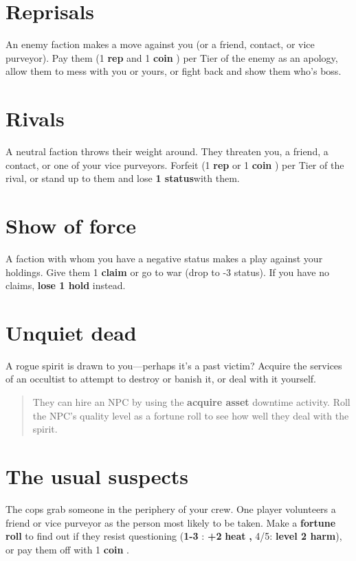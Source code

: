 \documentclass[11pt,oneside]{book}
\newcommand{\gameterm}[1]{\textbf{#1}}
\begin{document}
\section{Reprisals}

An enemy faction makes a move against you (or a friend, contact, or vice purveyor). Pay them (1 \gameterm{rep}  and 1 \gameterm{coin} ) per Tier of the enemy as an apology, allow them to mess with you or yours, or fight back and show them who’s boss.

\section{Rivals}

A neutral faction throws their weight around. They threaten you, a friend, a contact, or one of your vice purveyors. Forfeit (1 \gameterm{rep}  or 1 \gameterm{coin} ) per Tier of the rival, or stand up to them and lose\textbf{ 1 status}with them.

\section{Show of force}

A faction with whom you have a negative status makes a play against your holdings. Give them 1 \textbf{claim} or go to war (drop to -3 status). If you have no claims, \textbf{lose 1 hold} instead.

\section{Unquiet dead}

A rogue spirit is drawn to you---perhaps it’s a past victim? Acquire the services of an occultist to attempt to destroy or banish it, or deal with it yourself.

\begin{quote}
	They can hire an NPC by using the \gameterm{acquire asset} downtime activity. Roll the NPC’s quality level as a fortune roll to see how well they deal with the spirit.
\end{quote} 

\section{The usual suspects}

The cops grab someone in the periphery of your crew. One player volunteers a friend or vice purveyor as the person most likely to be taken. Make a \textbf{fortune roll} to find out if they resist questioning (\gameterm{1-3} : \textbf{+2 }\gameterm{heat} \textbf{, }4/5:\textbf{ level 2 harm}), or pay them off with 1 \gameterm{coin} .
\end{document}
